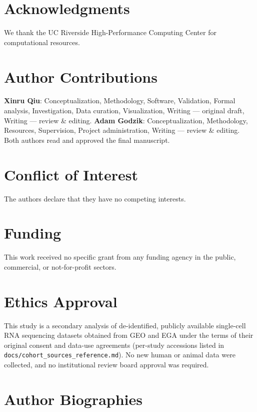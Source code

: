 \documentclass[11pt,a4paper]{article}
\begin{document}
\section*{Acknowledgments}

We thank the UC Riverside High-Performance Computing Center for computational resources.

\section*{Author Contributions}

\textbf{Xinru Qiu}: Conceptualization, Methodology, Software, Validation, Formal analysis,
Investigation, Data curation, Visualization, Writing --- original draft,
Writing --- review \& editing.
\textbf{Adam Godzik}: Conceptualization, Methodology, Resources, Supervision,
Project administration, Writing --- review \& editing.
Both authors read and approved the final manuscript.

\section*{Conflict of Interest}

The authors declare that they have no competing interests.

\section*{Funding}

This work received no specific grant from any funding agency in the public,
commercial, or not-for-profit sectors.

\section*{Ethics Approval}

This study is a secondary analysis of de-identified, publicly available
single-cell RNA sequencing datasets obtained from GEO and EGA under the terms of
their original consent and data-use agreements (per-study accessions listed in
\texttt{docs/cohort\_sources\_reference.md}). No new human or animal data were
collected, and no institutional review board approval was required.

\section*{Author Biographies}
\end{document}
